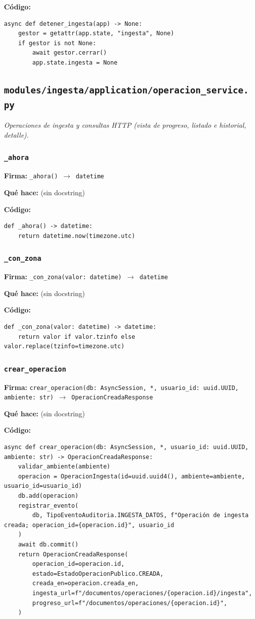 \documentclass[11pt,a4paper]{article}
\begin{document}
\textbf{Código:}
\begin{lstlisting}
async def detener_ingesta(app) -> None:
    gestor = getattr(app.state, "ingesta", None)
    if gestor is not None:
        await gestor.cerrar()
        app.state.ingesta = None
\end{lstlisting}

\subsection{\texttt{modules/ingesta/application/operacion\_service.py}}
\textit{Operaciones de ingesta y consultas HTTP (vista de progreso, listado e historial, detalle).}

\subsubsection*{\texttt{\_ahora}}
\textbf{Firma:} \texttt{\_ahora() $\rightarrow$ datetime}

\textbf{Qué hace:} (sin docstring)

\textbf{Código:}
\begin{lstlisting}
def _ahora() -> datetime:
    return datetime.now(timezone.utc)
\end{lstlisting}

\subsubsection*{\texttt{\_con\_zona}}
\textbf{Firma:} \texttt{\_con\_zona(valor: datetime) $\rightarrow$ datetime}

\textbf{Qué hace:} (sin docstring)

\textbf{Código:}
\begin{lstlisting}
def _con_zona(valor: datetime) -> datetime:
    return valor if valor.tzinfo else valor.replace(tzinfo=timezone.utc)
\end{lstlisting}

\subsubsection*{\texttt{crear\_operacion}}
\textbf{Firma:} \texttt{crear\_operacion(db: AsyncSession, *, usuario\_id: uuid.UUID, ambiente: str) $\rightarrow$ OperacionCreadaResponse}

\textbf{Qué hace:} (sin docstring)

\textbf{Código:}
\begin{lstlisting}
async def crear_operacion(db: AsyncSession, *, usuario_id: uuid.UUID, ambiente: str) -> OperacionCreadaResponse:
    validar_ambiente(ambiente)
    operacion = OperacionIngesta(id=uuid.uuid4(), ambiente=ambiente, usuario_id=usuario_id)
    db.add(operacion)
    registrar_evento(
        db, TipoEventoAuditoria.INGESTA_DATOS, f"Operación de ingesta creada; operacion_id={operacion.id}", usuario_id
    )
    await db.commit()
    return OperacionCreadaResponse(
        operacion_id=operacion.id,
        estado=EstadoOperacionPublico.CREADA,
        creada_en=operacion.creada_en,
        ingesta_url=f"/documentos/operaciones/{operacion.id}/ingesta",
        progreso_url=f"/documentos/operaciones/{operacion.id}",
    )
\end{lstlisting}
\end{document}
